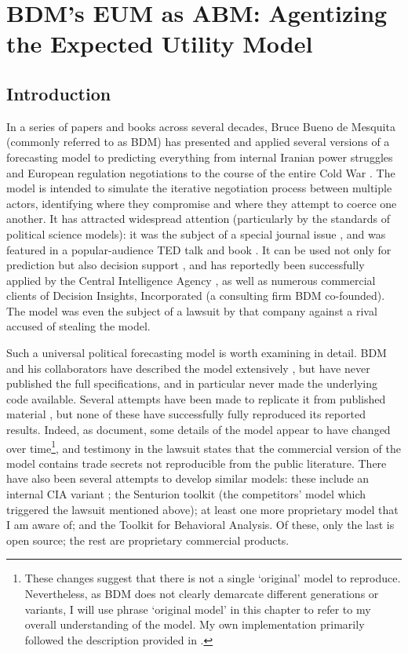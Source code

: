 \chapter[BDM's EUM as ABM]{BDM's EUM as ABM: Agentizing the Expected Utility Model}

\section{Introduction}

In a series of papers and books across several decades, Bruce Bueno de Mesquita (commonly referred to as BDM) has presented and applied several versions of a forecasting model to predicting everything from internal Iranian power struggles \citeyearpar{bdm_1984} and European regulation negotiations \citeyearpar{bdm_1994} to the course of the entire Cold War \citeyearpar{bdm_1998}. The model is intended to simulate the iterative negotiation process between multiple actors, identifying where they compromise and where they attempt to coerce one another. It has attracted widespread attention (particularly by the standards of political science models): it was the subject of a special journal issue \citep{kugler_1997}, and was featured in a popular-audience TED talk \citep{bdm_2009} and book \citep{bdm_2010}. It can be used not only for prediction but also decision support \citep{root_2013}, and has reportedly been successfully applied by the Central Intelligence Agency \citep{feder_1992}, as well as numerous commercial clients of Decision Insights, Incorporated (a consulting firm BDM co-founded). The model was even the subject of a lawsuit by that company against a rival \citep{dii_2011} accused of stealing the model. 

Such a universal political forecasting model is worth examining in detail. BDM and his collaborators have described the model extensively \citep{bdm_1984,bdm_1994,bdm_1997,bdm_2002,bdm_2011}, but have never published the full specifications, and in particular never made the underlying code available. Several attempts have been made to replicate it from published material \citep{scholz_2011,kimbrough_2014,mckibben_sanders_2014}, but none of these have successfully fully reproduced its reported results. Indeed, as \citet{scholz_2011} document, some details of the model appear to have changed over time\footnote{These changes suggest that there is not a single `original' model to reproduce. Nevertheless, as BDM does not clearly demarcate different generations or variants, I will use phrase `original model' in this chapter to refer to my overall understanding of the model. My own implementation primarily followed the description provided in \citet{bdm_2002}.}, and testimony in the \citet{dii_2011} lawsuit states that the commercial version of the model contains trade secrets not reproducible from the public literature. There have also been several attempts to develop similar models: these include an internal CIA variant \citep{feder_1992}; the Senturion toolkit \citep{abdollahian_2006} (the competitors' model which triggered the lawsuit mentioned above); at least one more proprietary model that I am aware of; and the \citet{wise_2015a} Toolkit for Behavioral Analysis. Of these, only the last is open source; the rest are proprietary commercial products.

